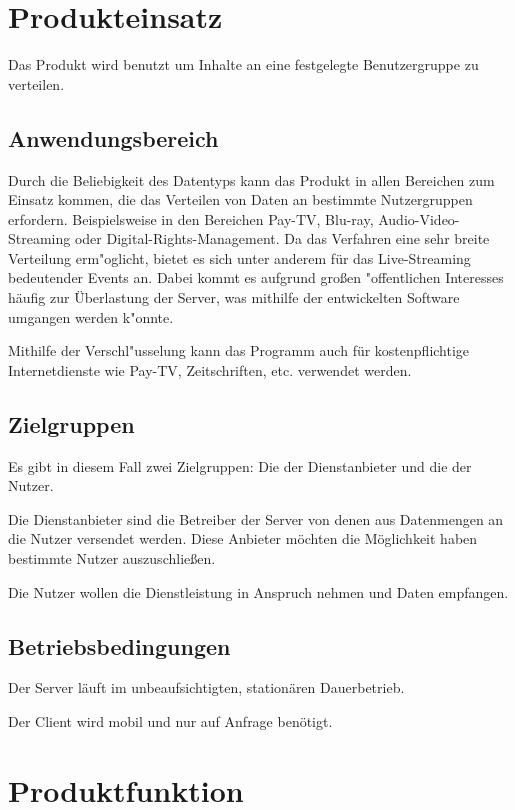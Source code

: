 \documentclass[a4paper,10pt]{scrartcl}
\begin{document}
\section{Produkteinsatz}

Das Produkt wird benutzt um Inhalte an eine festgelegte Benutzergruppe zu verteilen. 

\subsection{Anwendungsbereich}

Durch die Beliebigkeit des Datentyps kann das Produkt in allen Bereichen zum Einsatz kommen, die das Verteilen von Daten an
bestimmte Nutzergruppen erfordern. Beispielsweise in den Bereichen Pay-TV, Blu-ray, Audio-Video-Streaming oder Digital-Rights-Management.
Da das Verfahren eine sehr breite Verteilung erm"oglicht, bietet es sich unter anderem für das Live-Streaming bedeutender Events an.  
Dabei kommt es aufgrund großen "offentlichen Interesses häufig zur Überlastung der Server, was mithilfe der entwickelten Software umgangen werden k"onnte.  

Mithilfe der Verschl"usselung kann das Programm auch für kostenpflichtige Internetdienste wie Pay-TV, Zeitschriften,  etc. verwendet werden.  

\subsection{Zielgruppen}

Es gibt in diesem Fall zwei Zielgruppen: Die der Dienstanbieter und die der Nutzer.

Die Dienstanbieter sind die Betreiber der Server von denen aus Datenmengen an die Nutzer versendet werden. Diese Anbieter möchten die Möglichkeit haben bestimmte Nutzer auszuschließen.

Die Nutzer wollen die Dienstleistung in Anspruch nehmen und Daten empfangen.

\subsection{Betriebsbedingungen}

Der Server läuft im unbeaufsichtigten, stationären Dauerbetrieb.

Der Client wird mobil und nur auf Anfrage benötigt.

\section{Produktfunktion}
\end{document}
